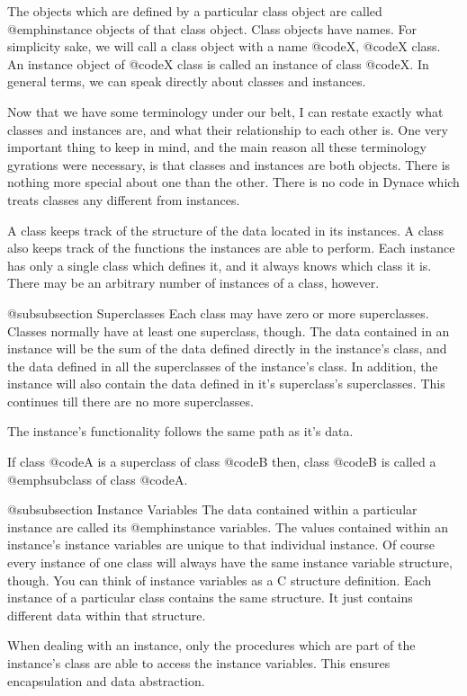 The objects which are defined by a particular class object are called
@emph{instance} objects of that class object.  Class objects have names. 
For simplicity sake, we will call a class object with a name @code{X},
@code{X} class.  An instance object of @code{X} class is called an
instance of class @code{X}.  In general terms, we can speak directly
about classes and instances.

Now that we have some terminology under our belt, I can restate exactly
what classes and instances are, and what their relationship to each
other is.  One very important thing to keep in mind, and the main reason 
all these terminology gyrations were necessary, is that classes and instances
are both objects.  There is nothing more special about one than the other.
There is no code in Dynace which treats classes any different from instances.

A class keeps track of the structure of the data located in its instances.
A class also keeps track of the functions the instances are able to perform.
Each instance has only a single class which defines it, and it always
knows which class it is.  There may be an arbitrary number of instances of
a class, however.

@subsubsection  Superclasses
Each class may have zero or more superclasses.  Classes normally have at
least one superclass, though.  The data contained in an instance will
be the sum of the data defined directly in the instance's class, and the
data defined in all the superclasses of the instance's class.  In
addition, the instance will also contain the data defined in it's
superclass's superclasses.  This continues till there are no more
superclasses.

The instance's functionality follows the same path as it's data.

If class @code{A} is a superclass of class @code{B} then, class @code{B}
is called a @emph{subclass} of class @code{A}.

@subsubsection Instance Variables
The data contained within a particular instance are called its
@emph{instance variables}.  The values contained within an instance's
instance variables are unique to that individual instance.  Of course
every instance of one class will always have the same instance variable
structure, though.  You can think of instance variables as a C structure
definition.  Each instance of a particular class contains the same
structure.  It just contains different data within that structure.

When dealing with an instance, only the procedures which are part of the
instance's class are able to access the instance variables.  This
ensures encapsulation and data abstraction.

